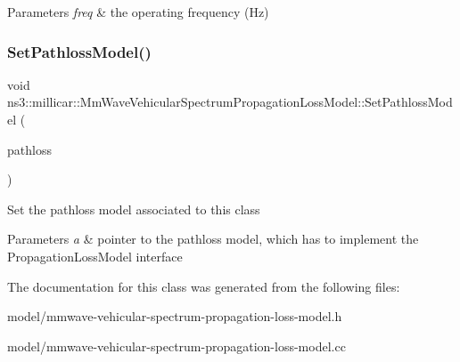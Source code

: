 \begin{DoxyParams}{Parameters}
{\em freq} & the operating frequency (Hz) \\
\hline
\end{DoxyParams}
\mbox{\label{classns3_1_1millicar_1_1MmWaveVehicularSpectrumPropagationLossModel_a87bc2bb292dc183649be9046062f3648}} 
\subsubsection{\texorpdfstring{Set\+Pathloss\+Model()}{SetPathlossModel()}}
{\footnotesize\ttfamily void ns3\+::millicar\+::\+Mm\+Wave\+Vehicular\+Spectrum\+Propagation\+Loss\+Model\+::\+Set\+Pathloss\+Model (\begin{DoxyParamCaption}\item[{Ptr$<$ Propagation\+Loss\+Model $>$}]{pathloss }\end{DoxyParamCaption})}

Set the pathloss model associated to this class 
\begin{DoxyParams}{Parameters}
{\em a} & pointer to the pathloss model, which has to implement the Propagation\+Loss\+Model interface \\
\hline
\end{DoxyParams}


The documentation for this class was generated from the following files\+:\begin{DoxyCompactItemize}
\item 
model/mmwave-\/vehicular-\/spectrum-\/propagation-\/loss-\/model.\+h\item 
model/mmwave-\/vehicular-\/spectrum-\/propagation-\/loss-\/model.\+cc\end{DoxyCompactItemize}
